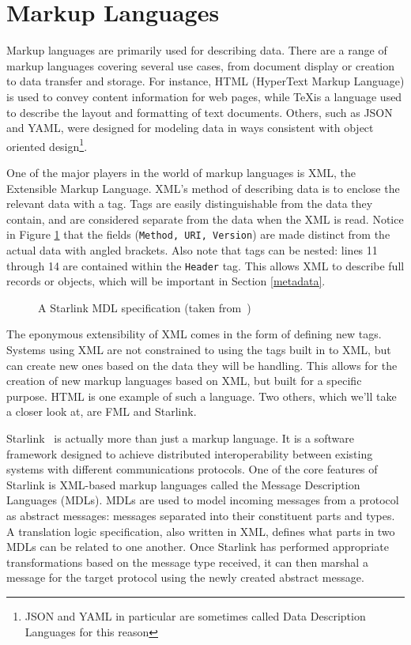 \documentclass{sig-alternate}
\begin{document}
\section{Markup Languages}\label{ML}
Markup languages are primarily used for describing data. There are a range of markup languages covering several use cases, from document display or creation to data transfer and storage. For instance, HTML (HyperText Markup Language) is used to convey content information for web pages, while \TeX is a language used to describe the layout and formatting of text documents.
Others, such as JSON and YAML, were designed for modeling data in ways consistent with object oriented design\footnote{JSON and YAML in particular are sometimes called Data Description Languages for this reason}. 

One of the major players in the world of markup languages is XML, the Extensible Markup Language. XML's method of describing data is to enclose the relevant data with a tag. Tags are easily distinguishable from the data they contain, and are considered separate from the data when the XML is read. Notice in Figure \ref{MDL1} that the fields ({\tt Method, URI, Version}) are made distinct from the actual data with angled brackets.
Also note that tags can be nested: lines 11 through 14 are contained within the {\tt Header} tag. This allows XML to describe full records or objects, which will be important in Section \ref{metadata}.


\begin{figure}
\caption{A Starlink MDL specification (taken from~\cite{Bromberg:2011})}
\label{MDL1}
\end{figure}


The eponymous extensibility of XML comes in the form of defining new tags. Systems using XML are not constrained to using the tags built in to XML, but can create new ones based on the data they will be handling. This allows for the creation of new markup languages based on XML, but built for a specific purpose. HTML is one example of such a language. Two others, which we'll take a closer look at, are FML and Starlink.

Starlink~\cite{Bromberg:2011} is actually more than just a markup language. It is a software framework designed to achieve distributed interoperability between existing systems with different communications protocols. One of the core features of Starlink is XML-based markup languages called the Message Description Languages (MDLs). MDLs are used to model incoming messages from a protocol as abstract messages: messages separated into their constituent parts and types. A translation logic specification, also written in XML, defines what parts in two MDLs can be related to one another. Once Starlink has performed appropriate transformations based on the message type received, it can then marshal a message for the target protocol using the newly created abstract message.
\end{document}
